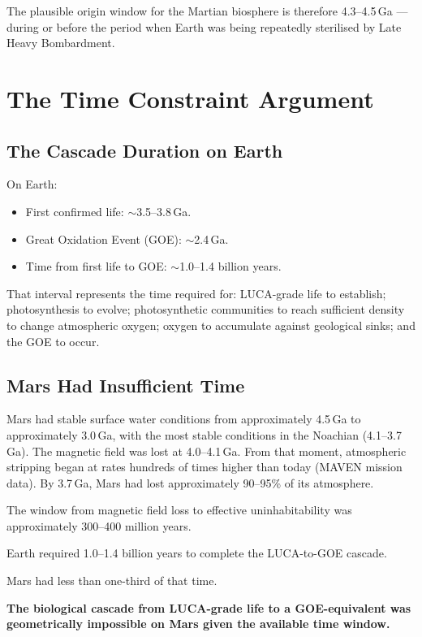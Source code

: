 \documentclass[11pt, a4paper]{article}
\begin{document}
The plausible origin window for the
Martian biosphere is therefore 4.3--4.5\,Ga ---
during or before the period when Earth was
being repeatedly sterilised by Late Heavy
Bombardment.

\section{The Time Constraint Argument}

\subsection{The Cascade Duration on Earth}

On Earth:

\begin{itemize}[leftmargin=*]
\item First confirmed life: $\sim$3.5--3.8\,Ga.
\item Great Oxidation Event (GOE): $\sim$2.4\,Ga.
\item Time from first life to GOE:
  $\sim$1.0--1.4 billion years.
\end{itemize}

That interval represents the time required for:
LUCA-grade life to establish;
photosynthesis to evolve;
photosynthetic communities to reach sufficient
density to change atmospheric oxygen;
oxygen to accumulate against geological sinks;
and the GOE to occur.

\subsection{Mars Had Insufficient Time}

Mars had stable surface water conditions
from approximately 4.5\,Ga to approximately
3.0\,Ga, with the most stable conditions in
the Noachian (4.1--3.7\,Ga).
The magnetic field was lost at 4.0--4.1\,Ga.
From that moment, atmospheric stripping
began at rates hundreds of times higher
than today (MAVEN mission data).
By 3.7\,Ga, Mars had lost approximately
90--95\% of its atmosphere.

The window from magnetic field loss to
effective uninhabitability was approximately
300--400 million years.

Earth required 1.0--1.4 billion years
to complete the LUCA-to-GOE cascade.

Mars had less than one-third of that time.

\textbf{The biological cascade from LUCA-grade
life to a GOE-equivalent was geometrically
impossible on Mars given the available time
window.}
\end{document}
